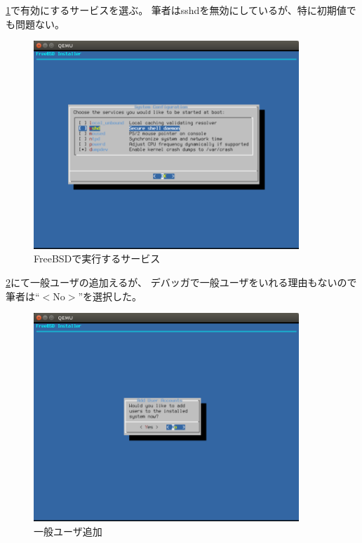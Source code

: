 \documentclass[a4j]{jarticle}
\begin{document}
\begin{multicols}{2}
\ref{fig:FreeBSD_Service}で有効にするサービスを選ぶ。
筆者はsshdを無効にしているが、特に初期値でも問題ない。
\begin{figure}[htbp]
	\begin{center}
    	\includegraphics[width=10cm]{./IMG/FreeBSD_SYS.png}
	\end{center}
    \caption{FreeBSDで実行するサービス}
    \label{fig:FreeBSD_Service}
\end{figure}

\ref{fig:FreeBSD_ADD_U}にて一般ユーザの追加えるが、
デバッガで一般ユーザをいれる理由もないので筆者は``$<$No$>$''を選択した。
\begin{figure}[htbp]
	\begin{center}
    	\includegraphics[width=10cm]{./IMG/FreeBSD_ADD_USER.png}
	\end{center}
    \caption{一般ユーザ追加}
    \label{fig:FreeBSD_ADD_U}
\end{figure}
\clearpage


\end{multicols}
\end{document}
